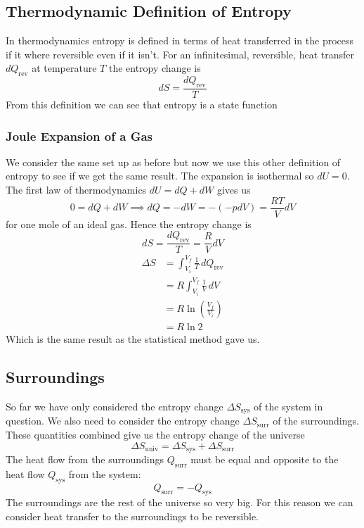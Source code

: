 \documentclass{article}
\begin{document}
    \subsection{Thermodynamic Definition of Entropy}
    In thermodynamics entropy is defined in terms of heat transferred in the process if it where reversible even if it isn't.
    For an infinitesimal, reversible, heat transfer \(dQ_\text{rev}\) at temperature \(T\) the entropy change is
    \[dS = \frac{dQ_\text{rev}}{T}\]
    From this definition we can see that entropy is a state function
    
    \subsubsection{Joule Expansion of a Gas}
    We consider the same set up as before but now we use this other definition of entropy to see if we get the same result.
    The expansion is isothermal so \(dU = 0\).
    The first law of thermodynamics \(dU = dQ + dW\) gives us 
    \[0 = dQ + dW\implies dQ = -dW = -(-pdV) = \frac{RT}{V}dV\]
    for one mole of an ideal gas.
    Hence the entropy change is
    \[dS = \frac{dQ_\text{rev}}{T} = \frac{R}{V}dV\]
    \begin{align*}
        \Delta S &= \int_{V_i}^{V_f}\frac{1}{T}\,dQ_\text{rev}\\
        &= R\int_{V_i}^{V_f}\frac{1}{V}\,dV\\
        &= R\ln\left(\frac{V_f}{V_i}\right)\\
        &= R\ln 2
    \end{align*}
    Which is the same result as the statistical method gave us.
    
    \subsection{Surroundings}
    So far we have only considered the entropy change \(\Delta S_\text{sys}\) of the system in question.
    We also need to consider the entropy change \(\Delta S_\text{surr}\) of the surroundings.
    These quantities combined give us the entropy change of the universe
    \[\Delta S_\text{univ} = \Delta S_\text{sys} + \Delta S_\text{surr}\]
    The heat flow from the surroundings \(Q_\text{surr}\) must be equal and opposite to the heat flow \(Q_\text{sys}\) from the system:
    \[Q_\text{surr} = - Q_\text{sys}\]
    The surroundings are the rest of the universe so very big.
    For this reason we can consider heat transfer to the surroundings to be reversible.
    
\end{document}
